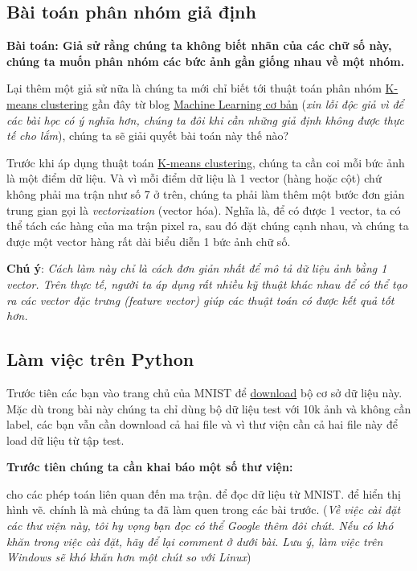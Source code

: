  
 
 
\subsection{Bài toán phân nhóm giả định}
\textbf{Bài toán: Giả sử rằng chúng ta không biết nhãn của các chữ số này, chúng ta muốn phân nhóm các bức ảnh gần giống nhau về một nhóm.} 
 
Lại thêm một giả sử nữa là chúng ta mới chỉ biết tới thuật toán phân nhóm \href{http://machinelearningcoban.com/2017/01/01/kmeans/}{K-means clustering} gần đây từ blog \href{https://tiepvupsu.github.io/}{Machine Learning cơ bản} (\textit{xin lỗi độc giả vì để các bài học có ý nghĩa hơn, chúng ta đôi khi cần những giả định không được thực tế cho lắm}), chúng ta sẽ giải quyết bài toán này thế nào? 
 
Trước khi áp dụng thuật toán \href{http://machinelearningcoban.com/2017/01/01/kmeans/}{K-means clustering}, chúng ta cần coi mỗi bức ảnh là một điểm dữ liệu. Và vì mỗi điểm dữ liệu là 1 vector (hàng hoặc cột) chứ không phải ma trận như số 7 ở trên, chúng ta phải làm thêm một bước đơn giản trung gian gọi là \textit{vectorization} (vector hóa). Nghĩa là, để có được 1 vector, ta có thể tách các hàng của ma trận pixel ra, sau đó đặt chúng cạnh nhau, và chúng ta được một vector hàng rất dài biểu diễn 1 bức ảnh chữ số.  
 
\textbf{Chú ý}: \textit{Cách làm này chỉ là cách đơn giản nhất để mô tả dữ liệu ảnh bằng 1 vector. Trên thực tế, người ta áp dụng rất nhiều kỹ thuật khác nhau để có thể tạo ra các vector đặc trưng (feature vector) giúp các thuật toán có được kết quả tốt hơn.} 
 
 
\subsection{Làm việc trên Python}
Trước tiên các bạn vào trang chủ của MNIST để \href{http://yann.lecun.com/exdb/mnist/ }{download} bộ cơ sở dữ liệu này. Mặc dù trong bài này chúng ta chỉ dùng bộ dữ liệu test với 10k ảnh và không cần label, các bạn vẫn cần download cả hai file  và  vì thư viện  cần cả hai file này để load dữ liệu từ tập test. 
 
\textbf{Trước tiên chúng ta cần khai báo một số thư viện:} 
 
 cho các phép toán liên quan đến ma trận. \href{https://pypi.python.org/pypi/python-mnist/}{} để đọc dữ liệu từ MNIST.  để hiển thị hình vẽ.  chính là  mà chúng ta đã làm quen trong các bài trước. (\textit{Về việc cài đặt các thư viện này, tôi hy vọng bạn đọc có thể Google thêm đôi chút. Nếu có khó khăn trong việc cài đặt, hãy để lại comment ở dưới bài. Lưu ý, làm việc trên Windows sẽ khó khăn hơn một chút so với Linux}) 
 
